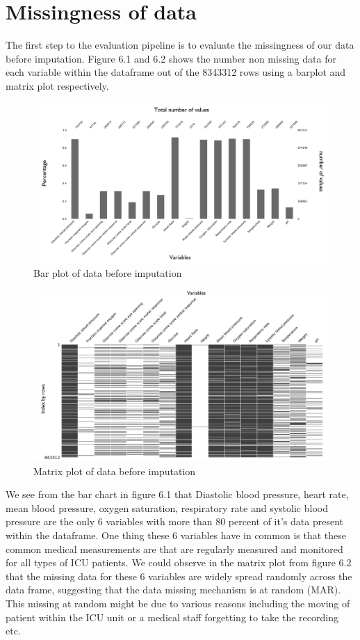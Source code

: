 \documentclass{l4proj}
\begin{document}
\section{Missingness of data}
The first step to the evaluation pipeline is to evaluate the missingness of our data before imputation. Figure 6.1 and 6.2 shows the number non missing data for each variable within the dataframe out of the 8343312 rows using a barplot and matrix plot respectively. 

\begin{figure}[!htb]
  \caption{Bar plot of data before imputation}
  \includegraphics[width=\textwidth]{dissertation/Latex/images/Missingness Figures/barplot.png}
\end{figure}

\begin{figure}[!htb]
  \caption{Matrix plot of data before imputation}
  \includegraphics[width=\textwidth]{dissertation/Latex/images/Missingness Figures/matrixplot.png}
\end{figure}

We see from the bar chart in figure 6.1 that Diastolic blood pressure, heart rate, mean blood pressure, oxygen saturation, respiratory rate and systolic blood pressure are the only 6 variables with more than 80 percent of it's data present within the dataframe. One thing these 6 variables have in common is that these common medical measurements are that are regularly measured and monitored for all types of ICU patients. We could observe in the matrix plot from figure 6.2 that the missing data for these 6 variables are widely spread randomly across the data frame, suggesting that the data missing mechanism is at random (MAR). This missing at random might be due to various reasons including the moving of patient within the ICU unit or a medical staff forgetting to take the recording etc. 
\end{document}
